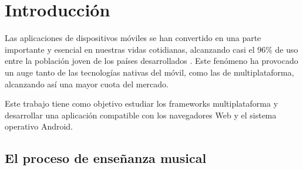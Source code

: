 
\chapter{Introducción}
\label{chap:introduccion}
Las aplicaciones de dispositivos móviles se han convertido en una parte importante y esencial en nuestras vidas cotidianas, alcanzando casi el 96\% de uso entre la población joven de los países desarrollados \citep{atske-2025}. Este fenómeno ha provocado un auge tanto de las tecnologías nativas del móvil, como las de multiplataforma, alcanzando así una mayor cuota del mercado.
\par Este trabajo tiene como objetivo estudiar los frameworks multiplataforma y desarrollar una aplicación compatible con los navegadores Web y el sistema operativo Android.

\section{El proceso de enseñanza musical}

%

